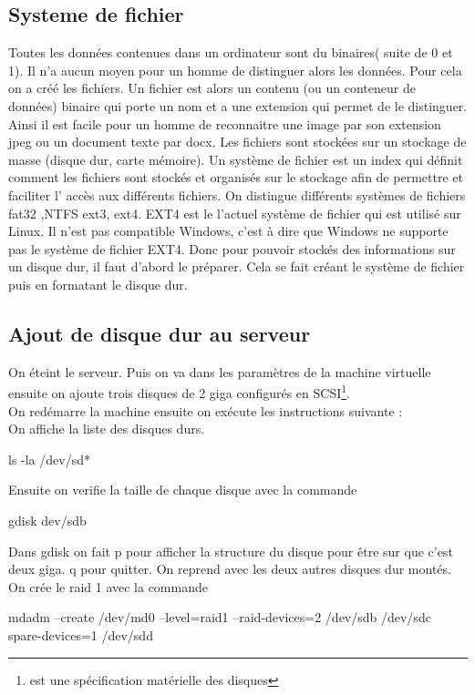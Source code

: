 \documentclass[a4paper,12pt,french]{report} %
\begin{document}
\subsection{Systeme de fichier}
	Toutes les données contenues dans un ordinateur sont du binaires( suite de 0 et 1). Il n'a aucun moyen pour un homme de distinguer alors les données. Pour cela on a créé les fichiers. Un fichier est alors un contenu (ou un conteneur de données) binaire qui porte un nom et a une extension qui permet de le distinguer. Ainsi il est facile pour un homme de reconnaitre une image par son extension jpeg ou un document texte par docx. Les fichiers sont stockées sur un stockage de masse (disque dur, carte mémoire). Un système de fichier est un index qui définit comment les fichiers sont stockés et organisés sur le stockage afin de permettre et faciliter l' accès aux différents fichiers. On distingue différents systèmes de fichiers fat32 ,NTFS ext3, ext4. EXT4 est le l'actuel système de fichier qui est utilisé sur Linux. Il n'est pas compatible Windows, c'est à dire que Windows ne supporte pas le système de fichier EXT4. Donc pour pouvoir stockés des informations sur un disque dur, il faut d'abord le préparer. Cela se fait créant le système de fichier puis en formatant le disque dur.
\subsection{Ajout de disque dur au serveur}	
	On éteint le serveur. Puis on va dans les paramètres de la machine virtuelle ensuite on ajoute trois disques de 2 giga configurés en SCSI\footnote{ est une spécification matérielle des disques}.\\
On redémarre la machine ensuite on exécute les instructions suivante : \\
On affiche la liste des disques durs. 
\begin{exempleConsole}
ls -la /dev/sd* 
\end{exempleConsole}

Ensuite on verifie la taille de chaque disque avec la commande
\begin{exempleConsole}
gdisk dev/sdb
\end{exempleConsole}

 Dans gdisk on fait p pour afficher la structure du disque pour être sur que c'est deux giga. q  pour quitter. On reprend avec les deux autres disques dur montés. \\
 On crée le raid 1 avec la commande  
\begin{exempleConsole}
mdadm --create /dev/md0 --level=raid1 --raid-devices=2 /dev/sdb /dev/sdc spare-devices=1 /dev/sdd
\end{exempleConsole}
\end{document}
